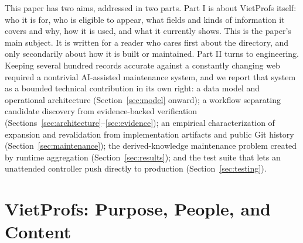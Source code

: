 \documentclass[11pt]{article}
\newcommand{\vplink}[2]{\href{https://vietprofs.roars.dev/?q=#1}{#2}}
\begin{document}

This paper has two aims, addressed in two parts.
Part I is about VietProfs itself: who it is for, who is eligible to appear, what fields and kinds of information it covers and why, how it is used, and what it currently shows.
This is the paper's main subject.
It is written for a reader who cares first about the directory, and only secondarily about how it is built or maintained.
Part II turns to engineering.
Keeping several hundred records accurate against a constantly changing web required a nontrivial AI-assisted maintenance system, and we report that system as a bounded technical contribution in its own right: a data model and operational architecture (Section~\ref{sec:model} onward); a workflow separating candidate discovery from evidence-backed verification (Sections~\ref{sec:architecture}--\ref{sec:evidence}); an empirical characterization of expansion and revalidation from implementation artifacts and public Git history (Section~\ref{sec:maintenance}); the derived-knowledge maintenance problem created by runtime aggregation (Section~\ref{sec:results}); and the test suite that lets an unattended controller push directly to production (Section~\ref{sec:testing}).

\begin{center}
\setlength{\fboxsep}{8pt}
\setlength{\fboxrule}{0.5pt}
\end{center}

\part{VietProfs: Purpose, People, and Content}
\end{document}
